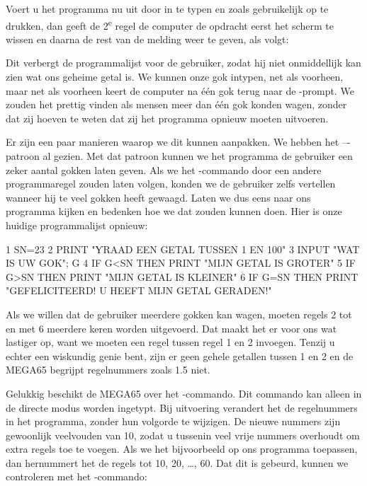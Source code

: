 
\needspace{2cm}
Voert u het programma nu uit door  in te typen en zoals gebruikelijk op  te drukken, dan geeft de 2\textsuperscript{e} regel de computer de opdracht eerst het scherm te wissen en daarna de rest van de melding weer te geven, als volgt:


Dit verbergt de programmalijst voor de gebruiker, zodat hij niet onmiddellijk kan zien wat ons geheime getal is. We kunnen onze gok intypen, net als voorheen, maar net als voorheen keert de computer na één gok terug naar de -prompt. We zouden het prettig vinden als mensen meer dan één gok konden wagen, zonder dat zij hoeven te weten dat zij het programma opnieuw moeten uitvoeren.

\needspace{3cm}
Er zijn een paar manieren waarop we dit kunnen aanpakken. We hebben het  ---patroon al gezien. Met dat patroon kunnen we het programma de gebruiker een zeker aantal gokken laten geven. Als we het -commando door een andere programmaregel zouden laten volgen, konden we de gebruiker zelfs vertellen wanneer hij te veel gokken heeft gewaagd. Laten we dus eens naar ons programma kijken en bedenken hoe we dat zouden kunnen doen. Hier is onze huidige programmalijst opnieuw:

\begin{screencode}
1 SN=23
2 PRINT "ƳRAAD EEN GETAL TUSSEN 1 EN 100"
3 INPUT "WAT IS UW GOK"; G
4 IF G<SN THEN PRINT "MIJN GETAL IS GROTER"
5 IF G>SN THEN PRINT "MIJN GETAL IS KLEINER"
6 IF G=SN THEN PRINT "GEFELICITEERD! U HEEFT MIJN GETAL GERADEN!"
\end{screencode}

Als we willen dat de gebruiker meerdere gokken kan wagen, moeten regels 2 tot en met 6 meerdere keren worden uitgevoerd. Dat maakt het er voor ons wat lastiger op, want we moeten een regel tussen regel 1 en 2 invoegen. Tenzij u echter een wiskundig genie bent, zijn er geen gehele getallen tussen 1 en 2 en de MEGA65 begrijpt regelnummers zoals 1.5 niet.

\needspace{4cm}
Gelukkig beschikt de MEGA65 over het
-commando. Dit commando kan alleen in de directe modus worden ingetypt. Bij uitvoering verandert het de regelnummers in het programma, zonder hun volgorde te wijzigen. De nieuwe nummers zijn gewoonlijk veelvouden van 10, zodat u tussenin veel vrije nummers overhoudt om extra regels toe te voegen. Als we het bijvoorbeeld op ons programma toepassen, dan hernummert het de regels tot 10, 20, \ldots, 60. Dat dit is gebeurd, kunnen we controleren met het -commando:

